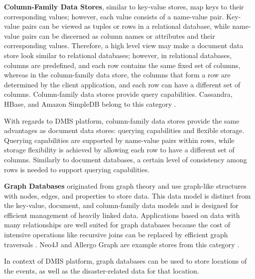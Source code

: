 \textbf{Column-Family Data Stores}, similar to key-value stores, map keys to their corresponding values; however, each value consists of a name-value pair. Key-value pairs can be viewed as tuples or rows in a relational database, while name-value pairs can be discerned as column names or attributes and their corresponding values. Therefore, a high level view may make a document data store look similar to relational databases; however, in relational databases, columns are predefined, and each row contains the same fixed set of columns, whereas in the column-family data store, the columns that form a row are determined by the client application, and each row can have a different set of columns. Column-family data stores provide query capabilities. Cassandra, HBase, and Amazon SimpleDB belong to this category \cite{sadalage2013nosql}.

With regards to DMIS platform, column-family data stores provide the same advantages as document data stores: querying capabilities and flexible storage. Querying capabilities are supported by name-value pairs within rows, while storage flexibility is achieved by allowing each row to have a different set of columns. Similarly to document databases, a certain level of consistency among rows is needed to support querying capabilities.

\textbf{Graph Databases} originated from graph theory and use graph-like structures with nodes, edges, and properties to store data. This data model is distinct from the key-value, document, and column-family data models and is designed for efficient management of heavily linked data. Applications based on data with many relationships are well suited for graph databases because the cost of intensive operations like recursive joins can be replaced by efficient graph traversals \cite{hecht2011nosql}. Neo4J and Allergo Graph are example stores from this category \cite{sadalage2013nosql}.

In context of DMIS platform, graph databases can be used to store locations of the events, as well as the disaster-related data for that location.

